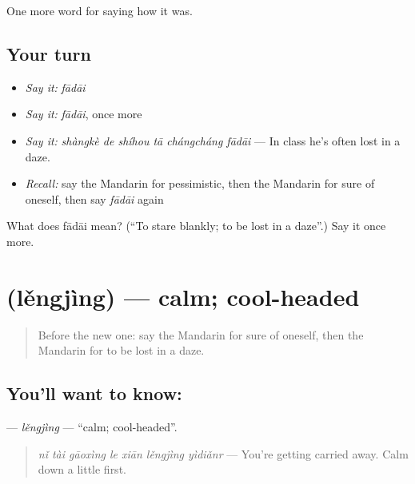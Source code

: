 \begin{grammarlens}[title={What you've built}]
One more word for saying how it was.
\end{grammarlens}

\subsection*{Your turn}
\begin{itemize}
\raggedright
  \item \emph{Say it:} \emph{fādāi}
  \item \emph{Say it:} \emph{fādāi}, once more
  \item \emph{Say it:} \emph{shàngkè de shíhou tā chángcháng fādāi} — In class he's often lost in a daze.
  \item \emph{Recall:} say the Mandarin for pessimistic, then the Mandarin for sure of oneself, then say \emph{fādāi} again
\end{itemize}

\begin{tcolorbox}[breakable,colback=teal!4,colframe=teal!35!black,title={Before you move on}]
What does fādāi mean? (\textquotedblleft{}To stare blankly; to be lost in a daze\textquotedblright{}.) Say it once more.
\end{tcolorbox}
\section[\texorpdfstring{\zh{冷静} (lěngjìng)}{冷静 (lěngjìng)}]{ (lěngjìng) — calm; cool-headed}

\label{lesson:ZH-C466-lengjing}



\begin{quote}
Before the new one: say the Mandarin for sure of oneself, then the Mandarin for to be lost in a daze.
\end{quote}

\subsection*{You'll want to know: }
\textbf{} — \emph{lěngjìng} — \textquotedblleft{}calm; cool-headed\textquotedblright{}.

\begin{quote}
\textbf{} \emph{nǐ tài gāoxìng le xiān lěngjìng yìdiǎnr} — You're getting carried away. Calm down a little first.
\end{quote}

